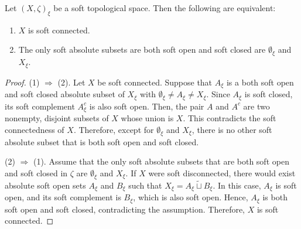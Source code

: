 \documentclass[preprint,12pt]{elsarticle}
\begin{document}
\begin{thm}
Let $(X, \zeta)_\xi $ be a soft topological space. Then the following are equivalent:
\begin{enumerate}
\item $X$ is soft connected.
\item The only soft absolute subsets are both soft open and soft closed are $\emptyset_\xi$ and $ X_\xi$.
\end{enumerate}
\end{thm}

\begin{proof}
(1) $\Rightarrow$ (2).
Let $X$ be  soft connected. Suppose that $A_\xi$ is a both soft open and soft closed absolute subset of $X_\xi$ with $\emptyset_\xi \neq A_\xi \neq X_\xi$. Since $A_\xi $ is soft closed, its soft complement $ A_\xi ^{c}$ is also soft open. Then, the pair $ A$ and $ A^{c}$ are two nonempty, disjoint  subsets of $X$ whose union is $X$. This contradicts the soft connectedness of $X$. Therefore, except for $\emptyset_\xi$ and $ X_\xi$, there is no other soft absolute subset that is both soft open and soft closed.

(2) $\Rightarrow$ (1).
Assume that the only soft absolute subsets that are both soft open and soft closed  in $\zeta$ are $\emptyset_\xi$ and $ X_\xi$. If $X$ were soft disconnected,  there would exist absolute soft open sets $A_\xi$ and $B_\xi$ such that $X_\xi = A_\xi \widetilde{\sqcup} B_\xi$.
In this case, $A_\xi$ is soft open, and its soft complement is $B_\xi$, which is also soft open. Hence, $A_\xi$ is both soft open and soft closed, contradicting the assumption. Therefore, $X$ is soft connected.

\end{proof}
\end{document}
